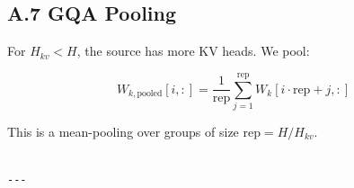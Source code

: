 \subsection{A.7 GQA Pooling}

For $H_{kv} < H$, the source has more KV heads. We pool:

\[
W_{k,\text{pooled}}[i, :] = \frac{1}{\text{rep}} \sum_{j=1}^{\text{rep}} W_{k}[i \cdot \text{rep} + j, :]
\tag{A.7}
\]

This is a mean-pooling over groups of size $\text{rep} = H / H_{kv}$.
\begin{lstlisting}

---
\end{lstlisting}